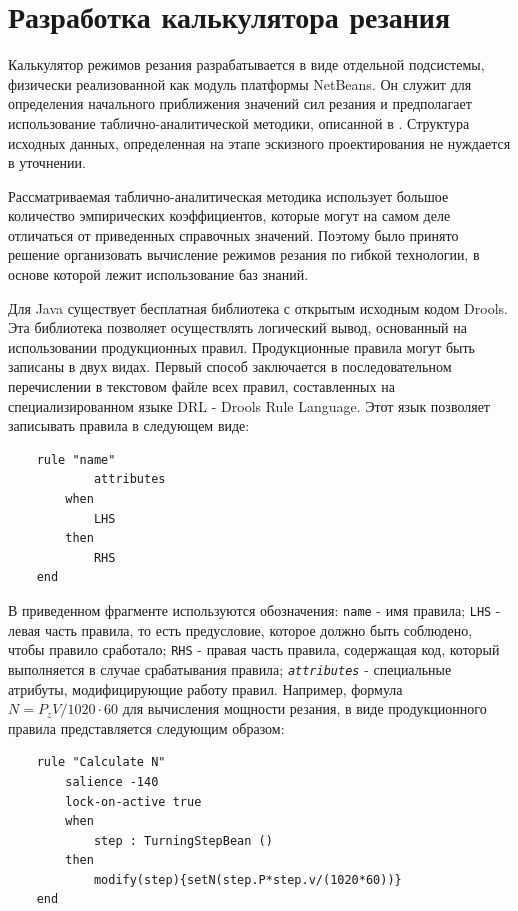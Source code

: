 \documentclass[14pt,oneside,final]{extreport}
\begin{document}
	\section{Разработка калькулятора резания}
	Калькулятор режимов резания разрабатывается в виде отдельной подсистемы, физически реализованной как  модуль платформы NetBeans. Он служит для определения начального приближения значений сил резания и предполагает использование таблично-аналитической методики, описанной в \cite{book:Kosilova}. Структура исходных данных, определенная на этапе эскизного проектирования не нуждается в уточнении.
	
	Рассматриваемая таблично-аналитическая методика использует большое количество эмпирических коэффициентов, которые могут на самом деле отличаться от приведенных справочных значений. Поэтому было принято решение организовать вычисление режимов резания по гибкой технологии, в основе которой лежит использование баз знаний. 
	
	Для Java существует бесплатная библиотека с открытым исходным кодом Drools. Эта библиотека позволяет осуществлять логический вывод, основанный на использовании продукционных правил. Продукционные правила могут быть записаны в двух видах. Первый способ заключается в последовательном перечислении в текстовом файле всех правил, составленных на специализированном языке DRL - Drools Rule Language. Этот язык позволяет записывать правила в следующем виде:
	\vspace{0.5cm}
	\begin{lstlisting}
	rule "name"
			attributes
		when
			LHS
		then
			RHS
	end
	\end{lstlisting}
	
	В приведенном фрагменте используются обозначения: {\tt name} - имя правила; {\tt LHS} - левая часть правила, то есть предусловие, которое должно быть соблюдено, чтобы правило сработало; {\tt RHS} - правая часть правила, содержащая код, который выполняется в случае срабатывания правила; {\tt \textit{attributes}} - специальные атрибуты, модифицирующие работу правил. Например, формула $ N = P_zV/1020\cdot60 $ для вычисления мощности резания, в виде продукционного правила представляется следующим образом:  
	\vspace{0.5cm}
	\begin{lstlisting} 
	rule "Calculate N" 
		salience -140
		lock-on-active true
		when
			step : TurningStepBean ()
		then
			modify(step){setN(step.P*step.v/(1020*60))}
	end
	\end{lstlisting}
	
\end{document}
